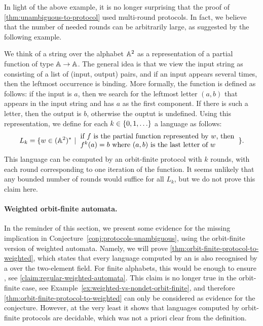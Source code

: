 In light of the above example, it is no longer surprising that the proof of
\cref{thm:unambiguous-to-protocol} used multi-round protocols. In fact, we
believe that the number of needed rounds can be arbitrarily large, as suggested
by the following example. 

\begin{myexample}
    We think of a string over the alphabet $\mathbb A^2$ as a representation of  a partial function of type $\mathbb A \to \mathbb A$. The general idea is that we view the input string as consisting of a list of (input, output) pairs, and if an input appears several times, then the leftmost occurrence is binding. More formally, the  function is defined as follows: if the input is $a$, then we search for the leftmost letter $(a,b)$ that appears in the input string and has $a$ as the first component. If there is such a letter, then the output is $b$, otherwise the ouptut is undefined. Using this representation, we define for each  $k \in \{0,1,\ldots\}$ a  language as follows:
    \begin{align*}
    L_k = \setbuild{ w \in (\atoms^2)^* }{ if $f$ is the partial function represented by $w$, then \\  $f^k(a)=b$ where $(a,b)$ is the last letter of $w$ }.
    \end{align*}
     This language can be computed by an orbit-finite protocol with $k$ rounds, with each round corresponding to one iteration of the function. It seems unlikely that any bounded number of rounds would suffice for all $L_k$, but we do not prove this claim here.
\end{myexample}


\paragraph*{Weighted orbit-finite automata.} In the reminder of this section,
we present some evidence for the missing implication in
Conjecture~\ref{conj:protocols-unambiguous}, using the orbit-finite version of
weighted automata. Namely, we will prove
\cref{thm:orbit-finite-protocol-to-weighted}, which states that every language
computed by an  is also recognised by a  over the two-element field. For finite alphabets, this
would be enough to ensure , see
\cref{claim:regular-weighted-automata}. This claim is no longer true in the
orbit-finite case, see Example~\ref{ex:weighted-vs-nondet-orbit-finite}, and
therefore \cref{thm:orbit-finite-protocol-to-weighted} can only be considered
as evidence for the conjecture. However, at the very least it shows that
languages computed by orbit-finite protocols are decidable, which was not a
priori clear from the definition.

